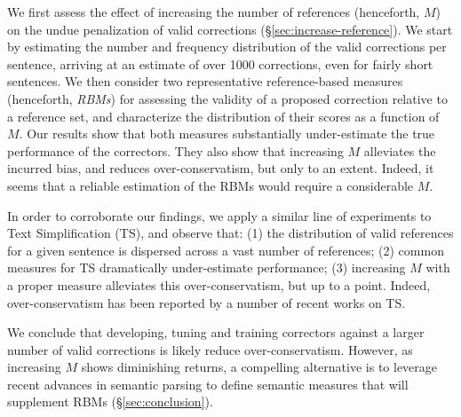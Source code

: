 \documentclass[letterpaper, 11pt]{article}
\begin{document}
We first assess the effect of increasing the number of references (henceforth, $M$) on 
the undue penalization of valid corrections (\S \ref{sec:increase-reference}).
We start by estimating the number and frequency distribution of the valid corrections per sentence, arriving 
at an estimate of over 1000 corrections, even for fairly short sentences.
We then consider two representative reference-based measures (henceforth, {\it RBMs}) for
assessing the validity of a proposed correction relative to a reference set, 
and characterize the distribution of their scores as a function of $M$. 
Our results show that both measures substantially under-estimate the true performance of
the correctors. They also show that increasing $M$ alleviates the incurred bias, 
and reduces over-conservatism, but only to an extent. 
Indeed, it seems that a reliable estimation of the RBMs would require a considerable $M$.

In order to corroborate our findings, we apply a 
similar line of experiments to Text Simplification (TS),
and observe that: (1) the distribution of valid references for a given sentence is dispersed across a vast number of references; 
(2) common measures for TS dramatically under-estimate performance; 
(3) increasing $M$ with a proper measure alleviates this over-conservatism, but up to a point.
Indeed, over-conservatism has been reported by a number of recent works on TS.%

We conclude that developing, tuning and training correctors against a larger number of valid corrections is likely reduce over-conservatism.
However, as increasing $M$ shows diminishing returns, a compelling alternative
is to leverage recent advances in semantic parsing to define semantic
measures that will supplement RBMs (\S\ref{sec:conclusion}). 


\end{document}
